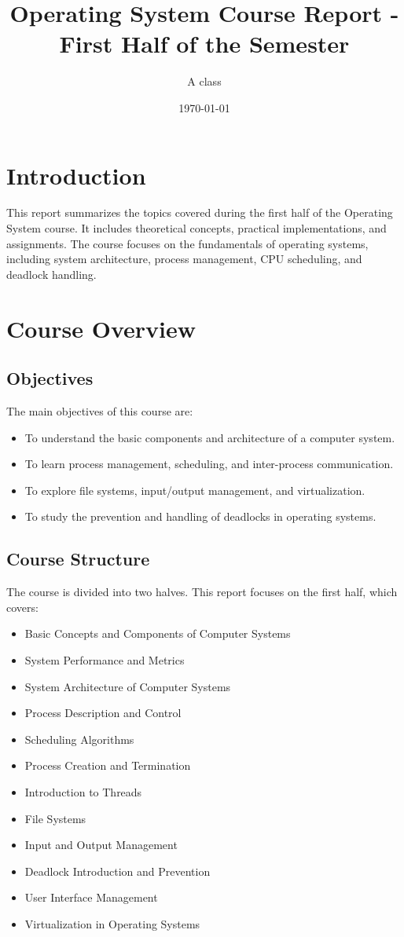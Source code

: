 \documentclass[12pt]{article}
\title{Operating System Course Report - First Half of the Semester}
\author{A class}
\date{\today}
\begin{document}
\maketitle
\newpage

\tableofcontents
\newpage

\section{Introduction}
This report summarizes the topics covered during the first half of the Operating System course. It includes theoretical concepts, practical implementations, and assignments. The course focuses on the fundamentals of operating systems, including system architecture, process management, CPU scheduling, and deadlock handling.

\section{Course Overview}
\subsection{Objectives}
The main objectives of this course are:
\begin{itemize}
    \item To understand the basic components and architecture of a computer system.
    \item To learn process management, scheduling, and inter-process communication.
    \item To explore file systems, input/output management, and virtualization.
    \item To study the prevention and handling of deadlocks in operating systems.
\end{itemize}

\subsection{Course Structure}
The course is divided into two halves. This report focuses on the first half, which covers:
\begin{itemize}
    \item Basic Concepts and Components of Computer Systems
    \item System Performance and Metrics
    \item System Architecture of Computer Systems
    \item Process Description and Control
    \item Scheduling Algorithms
    \item Process Creation and Termination
    \item Introduction to Threads
    \item File Systems
    \item Input and Output Management
    \item Deadlock Introduction and Prevention
    \item User Interface Management
    \item Virtualization in Operating Systems
\end{itemize}
\end{document}
